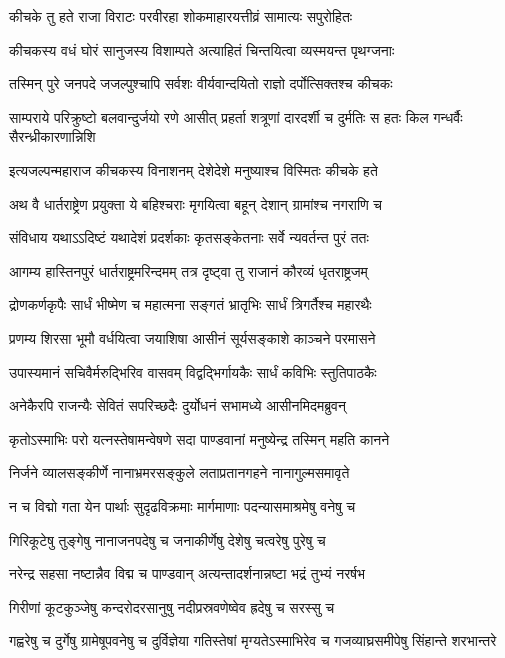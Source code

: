 \twolineshloka
{कीचके तु हते राजा विराटः परवीरहा}
{शोकमाहारयत्तीव्रं सामात्यः सपुरोहितः}


\twolineshloka
{कीचकस्य वधं घोरं सानुजस्य विशाम्पते}
{अत्याहितं चिन्तयित्वा व्यस्मयन्त पृथग्जनाः}


\twolineshloka
{तस्मिन् पुरे जनपदे जजल्पुश्चापि सर्वशः}
{वीर्यवान्दयितो राज्ञो दर्पोत्सिक्तश्च कीचकः}


\threelineshloka
{साम्पराये परिक्रुष्टो बलवान्दुर्जयो रणे}
{आसीत् प्रहर्ता शत्रूणां दारदर्शी च दुर्मतिः}
{स हतः किल गन्धर्वैः सैरन्ध्रीकारणान्निशि}


\twolineshloka
{इत्यजल्पन्महाराज कीचकस्य विनाशनम्}
{देशेदेशे मनुष्याश्च विस्मितः कीचके हते}


\twolineshloka
{अथ वै धार्तराष्ट्रेण प्रयुक्ता ये बहिश्चराः}
{मृगयित्वा बहून् देशान् ग्रामांश्च नगराणि च}


\twolineshloka
{संविधाय यथाऽऽदिष्टं यथादेशं प्रदर्शकाः}
{कृतसङ्केतनाः सर्वे न्यवर्तन्त पुरं ततः}


\twolineshloka
{आगम्य हास्तिनपुरं धार्तराष्ट्रमरिन्दमम्}
{तत्र दृष्ट्वा तु राजानं कौरव्यं धृतराष्ट्रजम्}


\twolineshloka
{द्रोणकर्णकृपैः सार्धं भीष्मेण च महात्मना}
{सङ्गतं भ्रातृभिः सार्धं त्रिगर्तैश्च महारथैः}


\twolineshloka
{प्रणम्य शिरसा भूमौ वर्धयित्वा जयाशिषा}
{आसीनं सूर्यसङ्काशे काञ्चने परमासने}


\twolineshloka
{उपास्यमानं सचिवैर्मरुद्भिरिव वासवम्}
{विद्वद्भिर्गायकैः सार्धं कविभिः स्तुतिपाठकैः}


\twolineshloka
{अनेकैरपि राजन्यैः सेवितं सपरिच्छदैः}
{दुर्योधनं सभामध्ये आसीनमिदमब्रुवन्}


\twolineshloka
{कृतोऽस्माभिः परो यत्नस्तेषामन्वेषणे सदा}
{पाण्डवानां मनुष्येन्द्र तस्मिन् महति कानने}


\twolineshloka
{निर्जने व्यालसङ्कीर्णे नानाभ्रमरसङ्कुले}
{लताप्रतानगहने नानागुल्मसमावृते}


\twolineshloka
{न च विद्मो गता येन पार्थाः सुदृढविक्रमाः}
{मार्गमाणाः पदन्यासमाश्रमेषु वनेषु च}


\twolineshloka
{गिरिकूटेषु तुङ्गेषु नानाजनपदेषु च}
{जनाकीर्णेषु देशेषु चत्वरेषु पुरेषु च}


\twolineshloka
{नरेन्द्र सहसा नष्टान्नैव विद्म च पाण्डवान्}
{अत्यन्तादर्शनान्नष्टा भद्रं तुभ्यं नरर्षभ}


\twolineshloka
{गिरीणां कूटकुञ्जेषु कन्दरोदरसानुषु}
{नदीप्रस्रवणेष्वेव ह्रदेषु च सरस्सु च}


\threelineshloka
{गह्वरेषु च दुर्गेषु ग्रामेषूपवनेषु च}
{दुर्विज्ञेया गतिस्तेषां मृग्यतेऽस्माभिरेव च}
{गजव्याघ्रसमीपेषु सिंहान्ते शरभान्तरे}


